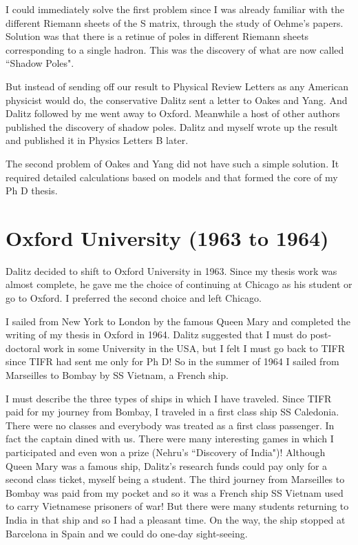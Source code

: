 I could immediately solve the first problem since I was already familiar 
with the different Riemann sheets of the S matrix, through the study of 
Oehme's papers. Solution was that there is a retinue of poles in 
different Riemann sheets corresponding to a single hadron. This was the 
discovery of what are now called ``Shadow Poles".

But instead of sending off our result to Physical Review Letters as any 
American physicist would do, the conservative Dalitz sent a letter to 
Oakes and Yang. And Dalitz followed by me went away to Oxford. Meanwhile 
a host of other authors published the discovery of shadow poles. Dalitz 
and myself wrote up the result and published it in Physics Letters B 
later.

The second problem of Oakes and Yang did not have such a simple 
solution. It required detailed calculations based on models and that 
formed the core of my Ph D thesis.

\section*{Oxford University (1963 to 1964)}

Dalitz decided to shift to Oxford University in 1963. Since my thesis 
work was almost complete, he gave me the choice of continuing at Chicago 
as his student or go to Oxford. I preferred the second choice and left 
Chicago.

I sailed from New York to London by the famous Queen Mary and completed 
the writing of my thesis in Oxford in 1964. Dalitz suggested that I must 
do post-doctoral work in some University in the USA, but I felt I must go 
back to TIFR since TIFR had sent me only for Ph D! So in the summer of 
1964 I sailed from Marseilles to Bombay by SS Vietnam, a French ship.

I must describe the three types of ships in which I have traveled. 
Since TIFR paid for my journey from Bombay, I traveled in a first class 
ship SS Caledonia. There were no classes and everybody was treated as a 
first class passenger. In fact the captain dined with us. There were many 
interesting games in which I participated and even won a prize (Nehru's 
``Discovery of India")! Although Queen Mary was a famous ship, Dalitz's 
research funds could pay only for a second class ticket, myself being a 
student. The third journey from Marseilles to Bombay was paid from my 
pocket and so it was a French ship SS Vietnam used to carry Vietnamese 
prisoners of war! But there were many students returning to India in 
that ship and so I had a pleasant time. On the way, the ship stopped at 
Barcelona in Spain and we could do one-day sight-seeing.

